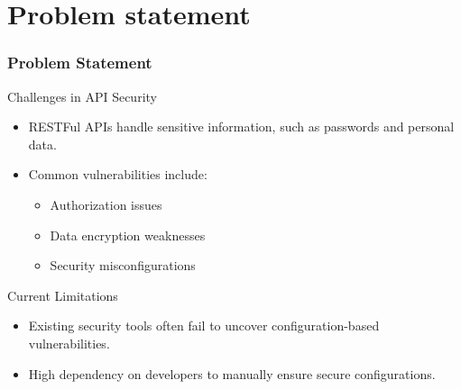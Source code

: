\documentclass[12pt]{beamer}
\theoremstyle{remark}
\theoremstyle{definition}
\begin{document}
%
%

\section{Problem statement}


\begin{frame}[allowframebreaks]
\frametitle{Problem Statement}
\begin{block}{Challenges in API Security}
\begin{itemize}
    \item RESTFul APIs handle sensitive information, such as passwords and personal data.
    \item Common vulnerabilities include:
    \begin{itemize}
        \item Authorization issues
        \item Data encryption weaknesses
        \item Security misconfigurations
    \end{itemize}
\end{itemize}
\end{block}

\begin{block}{Current Limitations}
\begin{itemize}
    \item Existing security tools often fail to uncover configuration-based vulnerabilities.
    \item High dependency on developers to manually ensure secure configurations.
\end{itemize}
\end{block}
\end{frame}
\end{document}
